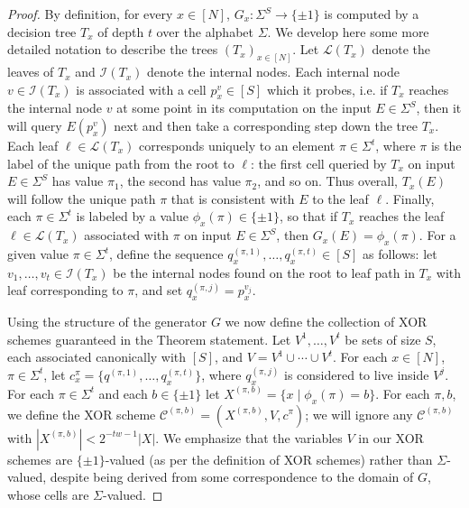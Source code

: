 \documentclass[11pt]{article}
\newcommand{\p}[1]{{(#1)}}
\newcommand{\N}{[N]}
\begin{document}
\begin{proof}

By definition, for every $x \in \N$, $G_x: \Sigma^S \to \{\pm 1\}$ is computed by a decision tree $T_x$ of depth $t$ over the alphabet $\Sigma$. We develop here some more detailed notation to describe the trees $(T_x)_{x \in \N}$. Let $\mathcal{L}(T_x)$ denote the leaves of $T_x$ and $\mathcal{I}(T_x)$ denote the internal nodes. Each internal node $v \in \mathcal{I}(T_x)$ is associated with a cell $p_x^v \in [S]$ which it probes, i.e. if $T_x$ reaches the internal node $v$ at some point in its computation on the input $E\in \Sigma^S$, then it will query $E(p_x^v)$ next and then take a corresponding step down the tree $T_x$. Each leaf $\ell \in \mathcal{L}(T_x)$ corresponds uniquely to an element $\pi \in \Sigma^t$, where $\pi$ is the label of the unique path from the root to $\ell$: the first cell queried by $T_x$ on input $E \in \Sigma^S$ has value $\pi_1$, the second has value $\pi_2$, and so on. Thus overall, $T_x(E)$ will follow the unique path $\pi$ that is consistent with $E$ to the leaf $\ell$. 
Finally, each $\pi \in \Sigma^t$ is labeled by a value $\phi_x(\pi) \in \{\pm 1\}$, so that if $T_x$ reaches the leaf $\ell \in \mathcal{L}(T_x)$ associated with $\pi$ on input $E\in \Sigma^S$, then $G_x(E) = \phi_x(\pi)$. For a given value $\pi\in \Sigma^t$, define the sequence $q_x^\p{\pi,1},\ldots,q_x^\p{\pi,t} \in [S]$ as follows: let $v_1,\ldots,v_t \in \mathcal{I}(T_x)$ be the internal nodes found on the root to leaf path in $T_x$ with leaf corresponding to $\pi$, and set $q_x^\p{\pi,j} = p_x^{v_j}$.

Using the structure of the generator $G$ we now define the collection of XOR schemes guaranteed in the Theorem statement. Let $V^1,\ldots, V^t$ be sets of size $S$, each associated canonically with $[S]$, and $V = V^1 \cup \cdots \cup V^t$. For each $x\in \N$, $\pi \in \Sigma^t$, let $c^{\pi}_x = \{q^\p{\pi,1},\ldots,q_x^\p{\pi,t}\}$, where $q_x^\p{\pi,j}$ is considered to live inside $V^j$. For each $\pi \in \Sigma^t$ and each $b \in \{\pm 1\}$ let $X^\p{\pi,b}= \{x \mid \phi_x(\pi)=b\}$. For each $\pi,b$, we define the XOR scheme $\mathcal{C}^\p{\pi,b} = (X^\p{\pi,b},V,c^\pi)$; we will ignore any $\mathcal{C}^\p{\pi,b}$ with $|X^\p{\pi,b}| < 2^{-tw-1}|X|$. We emphasize that the variables $V$ in our XOR schemes are $\{\pm 1\}$-valued (as per the definition of XOR schemes) rather than $\Sigma$-valued, despite being derived from some correspondence to the domain of $G$, whose cells are $\Sigma$-valued.


\end{proof}
\end{document}
